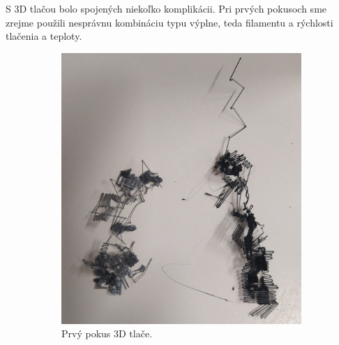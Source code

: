 S 3D tlačou bolo spojených niekoľko komplikácii. Pri prvých pokusoch sme zrejme použili nesprávnu kombináciu typu výplne, teda filamentu a rýchlosti tlačenia a teploty. 
\begin{figure}[h]
    \centering
    \begin{subfigure}[b]{0.49\textwidth}
        \centering
	\includegraphics[width=\textwidth]{images/tlac_prvy_pokus.jpg}
	\caption[Prvý pokus 3D tlače.]{Prvý pokus 3D tlače.}
    \label{fig:prvy_pokus}
    \end{subfigure}
    \hfill
    \begin{subfigure}[b]{0.49\textwidth}
     \centering	

\end{subfigure}
\end{figure}

